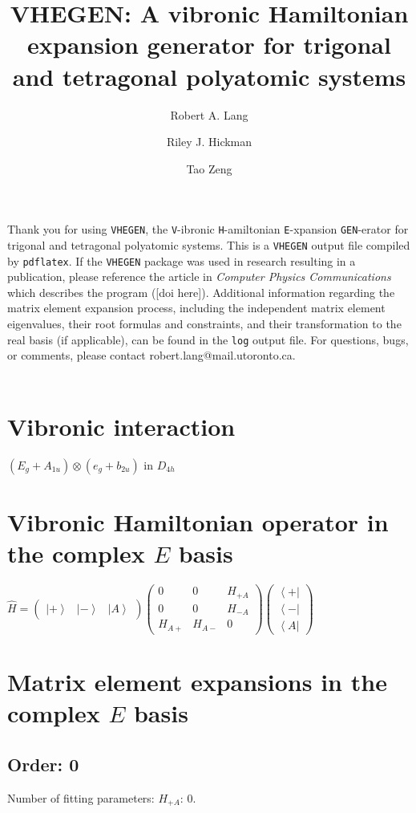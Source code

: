 \documentclass[fleqn]{article}
\title{VHEGEN: A vibronic Hamiltonian expansion generator for trigonal and tetragonal polyatomic systems}
\author{Robert A. Lang \and Riley J. Hickman \and Tao Zeng}
\date{}
\begin{document}
\maketitle
Thank you for using \texttt{VHEGEN}, the \texttt{V}-ibronic \texttt{H}-amiltonian \texttt{E}-xpansion \texttt{GEN}-erator for trigonal and tetragonal polyatomic systems. This is a \texttt{VHEGEN} output file compiled by \texttt{pdflatex}. If the \texttt{VHEGEN} package was used in research resulting in a publication, please reference the article in \textit{Computer Physics Communications} which describes the program ([doi here]). Additional information regarding the matrix element expansion process, including the independent matrix element eigenvalues, their root formulas and constraints, and their transformation to the real basis (if applicable), can be found in the \texttt{log} output file. For questions, bugs, or comments, please contact robert.lang@mail.utoronto.ca.\\\\
\tableofcontents
\newpage
\section{Vibronic interaction}
$(E_{g}+A_{1u}) \otimes (e_{g}+b_{2u})$ in $D_{4h}$
\section{Vibronic Hamiltonian operator in the complex $E$ basis}
$\hat{H}=\left(\begin{matrix}{\left|+\right\rangle } & {\left|-\right\rangle } & {\left|A\right\rangle }\end{matrix}\right) \left(\begin{matrix}0 & 0 & H_{+A}\\0 & 0 & H_{-A}\\H_{A+} & H_{A-} & 0\end{matrix}\right) \left(\begin{matrix}{\left\langle +\right|}\\{\left\langle -\right|}\\{\left\langle A\right|}\end{matrix}\right)$
\section{Matrix element expansions in the complex $E$ basis}
\subsection{Order: 0}
Number of fitting parameters: $H_{+A}$: $0$.
\end{document}
